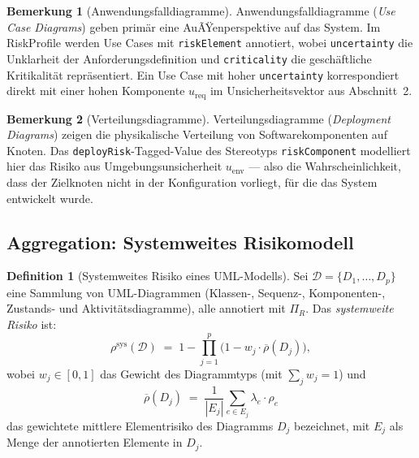 ﻿\documentclass[a4paper,12pt]{article}
\theoremstyle{definition}
\newtheorem{definition}{Definition}
\newtheorem{bemerkung}{Bemerkung}
\begin{document}
\begin{bemerkung}[Anwendungsfalldiagramme]
    Anwendungsfalldiagramme (\emph{Use Case Diagrams}) geben prim\"ar eine
    AuÃŸenperspektive auf das System. Im \textsf{RiskProfile} werden Use Cases mit
    \texttt{\guillemotleft{}riskElement\guillemotright{}} annotiert, wobei
    \texttt{uncertainty} die Unklarheit der Anforderungsdefinition und
    \texttt{criticality} die gesch\"aftliche Kritikalit\"at repr\"asentiert. Ein
    Use Case mit hoher \texttt{uncertainty} korrespondiert direkt mit einer hohen
    Komponente $u_{\mathrm{req}}$ im Unsicherheitsvektor aus Abschnitt~2.
\end{bemerkung}

\begin{bemerkung}[Verteilungsdiagramme]
    Verteilungsdiagramme (\emph{Deployment Diagrams}) zeigen die physikalische
    Verteilung von Softwarekomponenten auf Knoten. Das \texttt{deployRisk}-Tagged-Value
    des Stereotyps \texttt{\guillemotleft{}riskComponent\guillemotright{}} modelliert
    hier das Risiko aus Umgebungsunsicherheit $u_{\mathrm{env}}$ --- also die
    Wahrscheinlichkeit, dass der Zielknoten nicht in der Konfiguration vorliegt,
    f\"ur die das System entwickelt wurde.
\end{bemerkung}

\subsection{Aggregation: Systemweites Risikomodell}

\begin{definition}[Systemweites Risiko eines UML-Modells]
\label{def:systemrisiko}
    Sei $\mathcal{D} = \{D_1, \ldots, D_p\}$ eine Sammlung von UML-Diagrammen
    (Klassen-, Sequenz-, Komponenten-, Zustands- und Aktivit\"atsdiagramme),
    alle annotiert mit $\Pi_R$. Das \emph{systemweite Risiko} ist:
    \[
        \rho^{\mathrm{sys}}(\mathcal{D}) \;=\; 1 - \prod_{j=1}^{p}
        \bigl(1 - w_j \cdot \overline{\rho}(D_j)\bigr),
    \]
    wobei $w_j \in [0,1]$ das Gewicht des Diagrammtyps (mit $\sum_j w_j = 1$) und
    \[
        \overline{\rho}(D_j) \;=\; \frac{1}{|E_j|}
        \sum_{e \in E_j} \lambda_e \cdot \rho_e
    \]
    das gewichtete mittlere Elementrisiko des Diagramms $D_j$ bezeichnet, mit
    $E_j$ als Menge der annotierten Elemente in $D_j$.
\end{definition}
\end{document}
